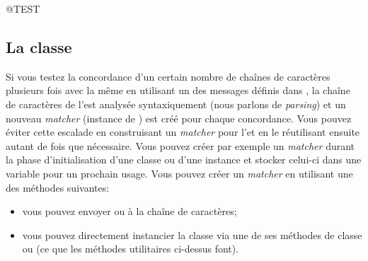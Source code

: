 \documentclass[a4paper,10pt,twoside]{book}
\begin{document}
\begin{code}{@TEST}
\subsection{La classe }

Si vous testez la concordance d'un certain nombre de chaînes de
caractères plusieurs fois avec la même \expreg en utilisant un des
messages définis dans , la chaîne de caractères de
l'\expreg est analysée syntaxiquement
(nous parlons de \emph{parsing})
et un nouveau \emph{matcher}
(instance de )
est créé pour chaque concordance. Vous pouvez éviter cette escalade en
construisant un \emph{matcher} pour l'\expreg et en le réutilisant
ensuite autant de fois que nécessaire. Vous pouvez créer par exemple
un \emph{matcher} durant la phase d'initialisation d'une classe ou
d'une instance et stocker celui-ci dans une variable pour un
prochain usage. Vous pouvez créer un \emph{matcher} en utilisant une
des méthodes suivantes:

\begin{itemize}
\item vous pouvez envoyer  ou
   à la chaîne de caractères;
\item vous pouvez directement instancier la classe  via
  une de ses méthodes de classe  ou
   (ce que les méthodes
  utilitaires ci-dessus font).

%

\end{itemize}


\end{code}
\end{document}
